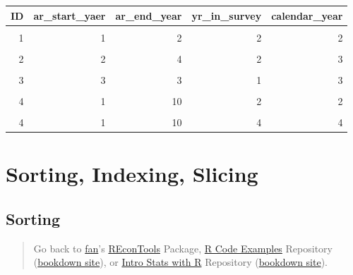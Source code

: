 \documentclass[
]{book}
\begin{document}
\begin{table}[!h]
\centering
\begin{tabular}{r|r|r|r|r}
\hline
ID & ar\_start\_yaer & ar\_end\_year & yr\_in\_survey & calendar\_year\\
\hline
\cellcolor{gray!6}{1} & \cellcolor{gray!6}{1} & \cellcolor{gray!6}{2} & \cellcolor{gray!6}{1} & \cellcolor{gray!6}{1}\\
\hline
1 & 1 & 2 & 2 & 2\\
\hline
\cellcolor{gray!6}{2} & \cellcolor{gray!6}{2} & \cellcolor{gray!6}{4} & \cellcolor{gray!6}{1} & \cellcolor{gray!6}{2}\\
\hline
2 & 2 & 4 & 2 & 3\\
\hline
\cellcolor{gray!6}{2} & \cellcolor{gray!6}{2} & \cellcolor{gray!6}{4} & \cellcolor{gray!6}{3} & \cellcolor{gray!6}{4}\\
\hline
3 & 3 & 3 & 1 & 3\\
\hline
\cellcolor{gray!6}{4} & \cellcolor{gray!6}{1} & \cellcolor{gray!6}{10} & \cellcolor{gray!6}{1} & \cellcolor{gray!6}{1}\\
\hline
4 & 1 & 10 & 2 & 2\\
\hline
\cellcolor{gray!6}{4} & \cellcolor{gray!6}{1} & \cellcolor{gray!6}{10} & \cellcolor{gray!6}{3} & \cellcolor{gray!6}{3}\\
\hline
4 & 1 & 10 & 4 & 4\\
\hline
\end{tabular}
\end{table}

\hypertarget{sorting-indexing-slicing}{%
\section{Sorting, Indexing, Slicing}\label{sorting-indexing-slicing}}

\hypertarget{sorting}{%
\subsection{Sorting}\label{sorting}}

\begin{quote}
Go back to \href{http://fanwangecon.github.io/}{fan}'s \href{https://fanwangecon.github.io/REconTools/}{REconTools} Package, \href{https://fanwangecon.github.io/R4Econ/}{R Code Examples} Repository (\href{https://fanwangecon.github.io/R4Econ/bookdown}{bookdown site}), or \href{https://fanwangecon.github.io/Stat4Econ/}{Intro Stats with R} Repository (\href{https://fanwangecon.github.io/Stat4Econ/bookdown}{bookdown site}).
\end{quote}
\end{document}
